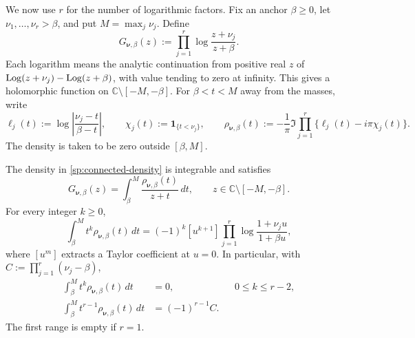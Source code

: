 We now use $r$ for the number of logarithmic factors.  Fix an
anchor $\beta\geq0$, let $\nu_1,\ldots,\nu_r>\beta$, and put
$M=\max_j\nu_j$.  Define
\begin{equation}
 G_{\boldsymbol\nu,\beta}(z)
 :=\prod_{j=1}^{r}
       \log\frac{z+\nu_j}{z+\beta}.
 \label{sp:connected-product}
\end{equation}
Each logarithm means the analytic continuation from positive
real $z$ of $\operatorname{Log}(z+\nu_j)-\operatorname{Log}(z+\beta)$, with value tending
to zero at infinity.  This gives a holomorphic function on
$\mathbb C\setminus[-M,-\beta]$.
For $\beta<t<M$ away from the masses, write
\begin{equation}
 \ell_j(t):=\log\left|\frac{\nu_j-t}{\beta-t}\right|,
 \qquad \chi_j(t):=\boldsymbol1_{\{t<\nu_j\}},
 \qquad
 \rho_{\boldsymbol\nu,\beta}(t)
 :=-\frac1\pi\Im\prod_{j=1}^{r}
                     \{\ell_j(t)-i\pi\chi_j(t)\}.
 \label{sp:connected-density}
\end{equation}
The density is taken to be zero outside $[\beta,M]$.

\begin{theorem}
\label{sp:compact-density}
The density in \eqref{sp:connected-density} is integrable and
satisfies
\begin{equation}
 G_{\boldsymbol\nu,\beta}(z)
 =\int_\beta^M\frac{\rho_{\boldsymbol\nu,\beta}(t)}{z+t}\,dt,
 \qquad z\in\mathbb C\setminus[-M,-\beta].
 \label{sp:compact-stieltjes}
\end{equation}
For every integer $k\geq0$,
\begin{equation}
 \int_\beta^M t^k\rho_{\boldsymbol\nu,\beta}(t)\,dt
 =(-1)^k[u^{k+1}]
       \prod_{j=1}^{r}\log\frac{1+\nu_j u}{1+\beta u},
 \label{sp:compact-moments}
\end{equation}
where $[u^m]$ extracts a Taylor coefficient at $u=0$.
In particular, with $C:=\prod_{j=1}^{r}(\nu_j-\beta)$,
\begin{align}
 \int_\beta^M t^k\rho_{\boldsymbol\nu,\beta}(t)\,dt&=0,
       &&0\leq k\leq r-2,\label{sp:vanishing-moments}\\
 \int_\beta^M t^{r-1}\rho_{\boldsymbol\nu,\beta}(t)\,dt
      &=(-1)^{r-1}C.
 \label{sp:first-nonzero-moment}
\end{align}
The first range is empty if $r=1$.
\end{theorem}

